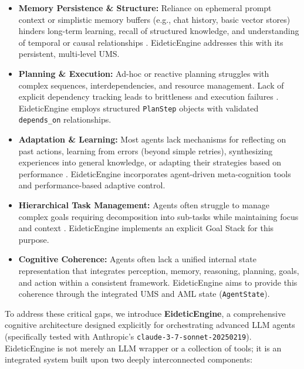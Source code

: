 \documentclass[12pt,a4paper]{article}
\newcommand{\code}[1]{\nolinkurl{#1}}
\begin{document}
\begin{itemize}
    \item \textbf{Memory Persistence \& Structure:} Reliance on ephemeral prompt context or simplistic memory buffers (e.g., chat history, basic vector stores) hinders long-term learning, recall of structured knowledge, and understanding of temporal or causal relationships \cite{Ref12, Ref23}. EideticEngine addresses this with its persistent, multi-level UMS.
    \item \textbf{Planning \& Execution:} Ad-hoc or reactive planning struggles with complex sequences, interdependencies, and resource management. Lack of explicit dependency tracking leads to brittleness and execution failures \cite{Ref15, Ref25}. EideticEngine employs structured \code{PlanStep} objects with validated \code{depends\_on} relationships.
    \item \textbf{Adaptation \& Learning:} Most agents lack mechanisms for reflecting on past actions, learning from errors (beyond simple retries), synthesizing experiences into general knowledge, or adapting their strategies based on performance \cite{Ref14, Ref17}. EideticEngine incorporates agent-driven meta-cognition tools and performance-based adaptive control.
    \item \textbf{Hierarchical Task Management:} Agents often struggle to manage complex goals requiring decomposition into sub-tasks while maintaining focus and context \cite{Ref8}. EideticEngine implements an explicit Goal Stack for this purpose.
    \item \textbf{Cognitive Coherence:} Agents often lack a unified internal state representation that integrates perception, memory, reasoning, planning, goals, and action within a consistent framework. EideticEngine aims to provide this coherence through the integrated UMS and AML state (\code{AgentState}).
\end{itemize}

To address these critical gaps, we introduce \textbf{EideticEngine}, a comprehensive cognitive architecture designed explicitly for orchestrating advanced LLM agents (specifically tested with Anthropic's \code{claude-3-7-sonnet-20250219}). EideticEngine is not merely an LLM wrapper or a collection of tools; it is an integrated system built upon two deeply interconnected components:
\end{document}
